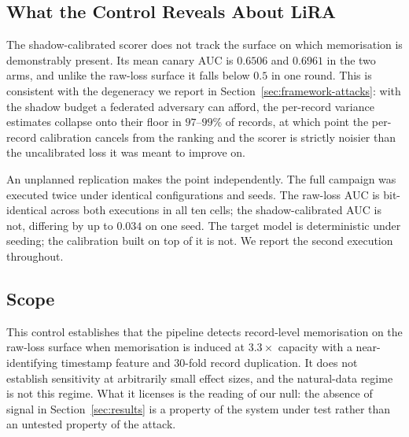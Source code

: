 \subsection{What the Control Reveals About LiRA}
\label{sec:validation-lira}

The shadow-calibrated scorer does not track the surface on which
memorisation is demonstrably present. Its mean canary AUC is $0.6506$ and
$0.6961$ in the two arms, and unlike the raw-loss surface it falls below
$0.5$ in one round. This is consistent with the degeneracy we report in
Section~\ref{sec:framework-attacks}: with the shadow budget a federated
adversary can afford, the per-record variance estimates collapse onto
their floor in $97$--$99$\% of records, at which point the per-record
calibration cancels from the ranking and the scorer is strictly noisier
than the uncalibrated loss it was meant to improve on.

An unplanned replication makes the point independently. The full campaign
was executed twice under identical configurations and seeds. The raw-loss
AUC is bit-identical across both executions in all ten cells; the
shadow-calibrated AUC is not, differing by up to $0.034$ on one seed. The
target model is deterministic under seeding; the calibration built on top
of it is not. We report the second execution throughout.

\subsection{Scope}
\label{sec:validation-scope}

This control establishes that the pipeline detects record-level
memorisation on the raw-loss surface when memorisation is induced at
$3.3\times$ capacity with a near-identifying timestamp feature and
$30$-fold record duplication. It does not establish sensitivity at
arbitrarily small effect sizes, and the natural-data regime is not this
regime. What it licenses is the reading of our null: the absence of signal
in Section~\ref{sec:results} is a property of the system under test rather
than an untested property of the attack.
